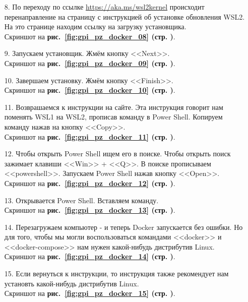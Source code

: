 \begin{itemize}
    \item[8.] По переходу по ссылке \url{https://aka.ms/wsl2kernel} происходит перенаправление
    на страницу с инструкцией об установке обновления WSL2.
    На это странице находим ссылку на загрузку установщика. \\
    Скриншот на \textbf{рис.~\ref{fig:gpi_pz_docker_08} (стр. \pageref{fig:gpi_pz_docker_08})}.

    \item[9.] Запускаем установщик. Жмём кнопку <<Next>>. \\
    Скриншот на \textbf{рис.~\ref{fig:gpi_pz_docker_09} (стр. \pageref{fig:gpi_pz_docker_09})}.
    
    \item[10.] Завершаем установку. Жмём кнопку <<Finish>>. \\
    Скриншот на \textbf{рис.~\ref{fig:gpi_pz_docker_10} (стр. \pageref{fig:gpi_pz_docker_10})}.

    \item[11.] Возврашаемся к инструкции на сайте. Эта инструкция говорит нам поменять WSL1 на WSL2,
    прописав команду в Power Shell. Копируем команду нажав на кнопку <<Copy>>. \\
    Скриншот на \textbf{рис.~\ref{fig:gpi_pz_docker_11} (стр. \pageref{fig:gpi_pz_docker_11})}.

    \item[12.] Чтобы открыть Power Shell ищем его в поиске.
    Чтобы открыть поиск зажимает клавиши <<Win>> + <<Q>>.
    В поиске прописываем <<powershell>>. Запускаем Power Shell нажав кнопку <<Open>>. \\
    Скриншот на \textbf{рис.~\ref{fig:gpi_pz_docker_12} (стр. \pageref{fig:gpi_pz_docker_12})}.

    \item[13.] Открывается Power Shell. Вставляем команду. \\
    Скриншот на \textbf{рис.~\ref{fig:gpi_pz_docker_13} (стр. \pageref{fig:gpi_pz_docker_13})}.

    \item[14.] Перезагружаем компьютер - и теперь Docker запускается без ошибки.
    Но для того, чтобы мы могли воспользоваться командами <<docker>> и <<docker-compose>>
    нам нужен какой-нибудь дистрибутив Linux. \\
    Скриншот на \textbf{рис.~\ref{fig:gpi_pz_docker_14} (стр. \pageref{fig:gpi_pz_docker_14})}.

    \item[15.] Если вернуться к инструкции, то инструкция также рекомендует нам установть
    какой-нибудь дистрибутив Linux. \\
    Скриншот на \textbf{рис.~\ref{fig:gpi_pz_docker_15} (стр. \pageref{fig:gpi_pz_docker_15})}.


\end{itemize}
